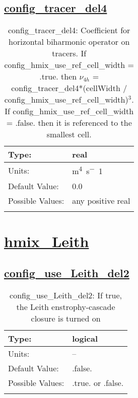 \subsection[config\_tracer\_del4]{\hyperref[sec:nm_tab_hmix_del4]{config\_tracer\_del4}}
\label{subsec:nm_sec_config_tracer_del4}
\begin{center}
\begin{longtable}{| p{2.0in} || p{4.0in} |}
    \hline
    Type: & real \\
    \hline
    Units: & \si{m^4.s^-1} \\
    \hline
    Default Value: & 0.0 \\
    \hline
    Possible Values: & any positive real \\
    \hline
    \caption{config\_tracer\_del4: Coefficient for horizontal biharmonic operator on tracers.  If config\_hmix\_use\_ref\_cell\_width = .true. then $\nu_{4h}$ = config\_tracer\_del4*(cellWidth / config\_hmix\_use\_ref\_cell\_width)$^3$. If config\_hmix\_use\_ref\_cell\_width = .false. then it is referenced to the smallest cell.}
\end{longtable}
\end{center}
\section[hmix\_Leith]{\hyperref[sec:nm_tab_hmix_Leith]{hmix\_Leith}}
\label{sec:nm_sec_hmix_Leith}
\subsection[config\_use\_Leith\_del2]{\hyperref[sec:nm_tab_hmix_Leith]{config\_use\_Leith\_del2}}
\label{subsec:nm_sec_config_use_Leith_del2}
\begin{center}
\begin{longtable}{| p{2.0in} || p{4.0in} |}
    \hline
    Type: & logical \\
    \hline
    Units: & -- \\
    \hline
    Default Value: & .false. \\
    \hline
    Possible Values: & .true. or .false. \\
    \hline
    \caption{config\_use\_Leith\_del2: If true, the Leith enstrophy-cascade closure is turned on}
\end{longtable}
\end{center}
